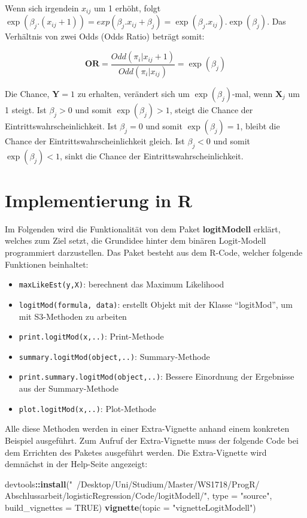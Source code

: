 \documentclass[12pt,]{article}
\newenvironment{Shaded}{\begin{snugshade}}{\end{snugshade}}
\newcommand{\KeywordTok}[1]{\textcolor[rgb]{0.13,0.29,0.53}{\textbf{#1}}}
\newcommand{\DataTypeTok}[1]{\textcolor[rgb]{0.13,0.29,0.53}{#1}}
\newcommand{\StringTok}[1]{\textcolor[rgb]{0.31,0.60,0.02}{#1}}
\newcommand{\OtherTok}[1]{\textcolor[rgb]{0.56,0.35,0.01}{#1}}
\newcommand{\OperatorTok}[1]{\textcolor[rgb]{0.81,0.36,0.00}{\textbf{#1}}}
\newcommand{\NormalTok}[1]{#1}
\providecommand{\tightlist}{%
  \setlength{\itemsep}{0pt}\setlength{\parskip}{0pt}}
\begin{document}
Wenn sich irgendein \(x_{ij}\) um 1 erhöht, folgt
\(\exp(\beta_j.(x_{ij}+1)) = exp(\beta_j.x_{ij}+\beta_j) = \exp(\beta_j.x_{ij}).\exp(\beta_j)\).
Das Verhältnis von zwei Odds (Odds Ratio) beträgt somit:

\[
\mathbf{OR} = \frac{Odd(\pi_i|x_{ij}+1)}{Odd(\pi_i|x_{ij})} = \exp(\beta_j)
\]

Die Chance, \(\mathbf{Y} = 1\) zu erhalten, verändert sich um
\(\exp(\beta_j)\)-mal, wenn \(\mathbf{X}_j\) um 1 steigt. Ist
\(\beta_j > 0\) und somit \(\exp(\beta_j) > 1\), steigt die Chance der
Eintrittswahrscheinlichkeit. Ist \(\beta_j = 0\) und somit
\(\exp(\beta_j) = 1\), bleibt die Chance der Eintrittswahrscheinlichkeit
gleich. Ist \(\beta_j < 0\) und somit \(\exp(\beta_j) < 1\), sinkt die
Chance der Eintrittswahrscheinlichkeit.

\section{Implementierung in R}\label{implementierung-in-r}

Im Folgenden wird die Funktionalität von dem Paket \textbf{logitModell}
erklärt, welches zum Ziel setzt, die Grundidee hinter dem binären
Logit-Modell programmiert darzustellen. Das Paket besteht aus dem
R-Code, welcher folgende Funktionen beinhaltet:

\begin{itemize}
\tightlist
\item
  \texttt{maxLikeEst(y,X)}: berechnent das Maximum Likelihood
\item
  \texttt{logitMod(formula,\ data)}: erstellt Objekt mit der Klasse
  ``logitMod'', um mit S3-Methoden zu arbeiten
\item
  \texttt{print.logitMod(x,..)}: Print-Methode
\item
  \texttt{summary.logitMod(object,..)}: Summary-Methode
\item
  \texttt{print.summary.logitMod(object,..)}: Bessere Einordnung der
  Ergebnisse aus der Summary-Methode
\item
  \texttt{plot.logitMod(x,..)}: Plot-Methode
\end{itemize}

Alle diese Methoden werden in einer Extra-Vignette anhand einem
konkreten Beispiel ausgeführt. Zum Aufruf der Extra-Vignette muss der
folgende Code bei dem Errichten des Paketes ausgeführt werden. Die
Extra-Vignette wird demnächst in der Help-Seite angezeigt:

\begin{Shaded}
\begin{Highlighting}[]
\NormalTok{devtools}\OperatorTok{::}\KeywordTok{install}\NormalTok{(}\StringTok{"~/Desktop/Uni/Studium/Master/WS1718/ProgR/}
\StringTok{                  Abschlussarbeit/logisticRegression/Code/logitModell/"}\NormalTok{, }
                  \DataTypeTok{type =} \StringTok{"source"}\NormalTok{, }\DataTypeTok{build_vignettes =} \OtherTok{TRUE}\NormalTok{)}
\KeywordTok{vignette}\NormalTok{(}\DataTypeTok{topic =} \StringTok{"vignetteLogitModell"}\NormalTok{)}
\end{Highlighting}
\end{Shaded}
\end{document}
